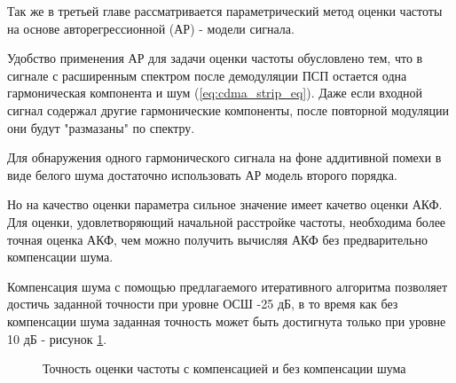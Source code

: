 Так же в третьей главе рассматривается параметрический метод оценки частоты на основе авторегрессионной (АР) - модели сигнала.

Удобство применения АР для задачи оценки частоты обусловлено тем, что в сигнале с расширенным спектром после демодуляции ПСП остается одна
гармоническая компонента и шум (\ref{eq:cdma_strip_eq}).  Даже если входной сигнал содержал другие гармонические компоненты,
после повторной модуляции они будут "размазаны" по спектру.

Для обнаружения одного гармонического сигнала на фоне аддитивной помехи в виде белого шума достаточно использовать АР модель второго порядка.

Но на качество оценки параметра сильное значение имеет качетво оценки АКФ. Для оценки, удовлетворяющий начальной расстройке частоты,
необходима более точная оценка АКФ, чем можно получить вычисляя АКФ без предварительно компенсации шума.

Компенсация шума с помощью предлагаемого итеративного алгоритма позволяет достичь заданной точности при уровне ОСШ -25 дБ, в то
время как без компенсации шума заданная точность может быть достигнута только при уровне 10 дБ - рисунок \ref{pic:ACF_boost}.

\begin{figure}[H]
\center{}
	\caption{Точность оценки частоты с компенсацией и без компенсации шума}
	\label{pic:ACF_boost}
\end{figure}
